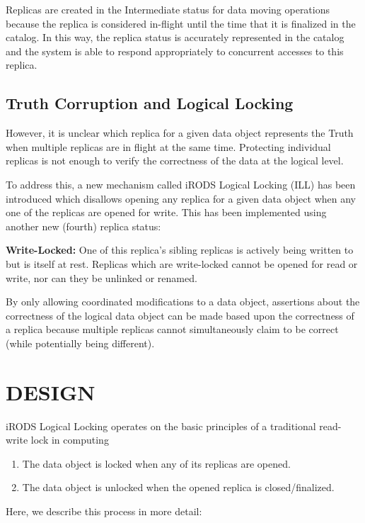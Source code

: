 \documentclass{irodsugm}
\begin{document}
Replicas are created in the Intermediate status for data moving operations because the replica is considered in-flight until the time that it is finalized in the catalog. In this way, the replica status is accurately represented in the catalog and the system is able to respond appropriately to concurrent accesses to this replica.

\subsection*{Truth Corruption and Logical Locking}

However, it is unclear which replica for a given data object represents the Truth when multiple replicas are in flight at the same time. Protecting individual replicas is not enough to verify the correctness of the data at the logical level.

To address this, a new mechanism called iRODS Logical Locking (ILL) has been introduced which disallows opening any replica for a given data object when any one of the replicas are opened for write. This has been implemented using another new (fourth) replica status:

\textbf{Write-Locked:} One of this replica's sibling replicas is actively being written to but is itself at rest. Replicas which are write-locked cannot be opened for read or write, nor can they be unlinked or renamed.

By only allowing coordinated modifications to a data object, assertions about the correctness of the logical data object can be made based upon the correctness of a replica because multiple replicas cannot simultaneously claim to be correct (while potentially being different).

\section*{DESIGN}

iRODS Logical Locking operates on the basic principles of a traditional read-write lock in computing\cite{readerswriterlock}

\begin{enumerate}
\item The data object is locked when any of its replicas are opened.
\item The data object is unlocked when the opened replica is closed/finalized.
\end{enumerate}

Here, we describe this process in more detail:
\end{document}
